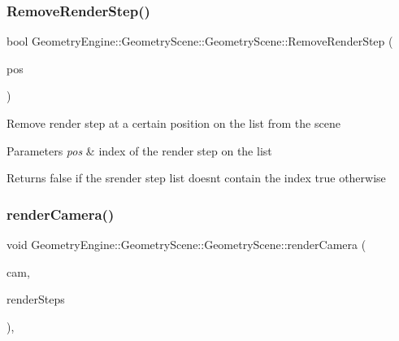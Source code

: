\subsubsection{\texorpdfstring{RemoveRenderStep()}{RemoveRenderStep()}}
{\footnotesize\ttfamily bool Geometry\+Engine\+::\+Geometry\+Scene\+::\+Geometry\+Scene\+::\+Remove\+Render\+Step (\begin{DoxyParamCaption}\item[{int}]{pos }\end{DoxyParamCaption})\hspace{0.3cm}{\ttfamily [virtual]}}

Remove render step at a certain position on the list from the scene 
\begin{DoxyParams}{Parameters}
{\em pos} & index of the render step on the list \\
\hline
\end{DoxyParams}
\begin{DoxyReturn}{Returns}
false if the srender step list doesn\textquotesingle{}t contain the index true otherwise 
\end{DoxyReturn}
\mbox{\label{class_geometry_engine_1_1_geometry_scene_1_1_geometry_scene_aef0be95a28a24292c03bf1138e246439}} 
\subsubsection{\texorpdfstring{renderCamera()}{renderCamera()}}
{\footnotesize\ttfamily void Geometry\+Engine\+::\+Geometry\+Scene\+::\+Geometry\+Scene\+::render\+Camera (\begin{DoxyParamCaption}\item[{\mbox{\hyperlink{class_geometry_engine_1_1_geometry_world_item_1_1_geometry_camera_1_1_camera}{Geometry\+World\+Item\+::\+Geometry\+Camera\+::\+Camera}} $\ast$}]{cam,  }\item[{const std\+::list$<$ \mbox{\hyperlink{class_geometry_engine_1_1_geometry_render_step_1_1_render_step}{Geometry\+Render\+Step\+::\+Render\+Step}} $\ast$ $>$ \&}]{render\+Steps }\end{DoxyParamCaption})\hspace{0.3cm}{\ttfamily [protected]}, {\ttfamily [virtual]}}

